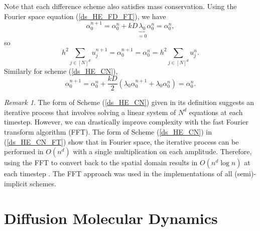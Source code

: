 \documentclass[12pt, reqno]{report}
\theoremstyle{definition}
\theoremstyle{remark}
\newtheorem{remark}[theorem]{Remark}
\begin{document}
Note that each difference scheme also satisfies mass conservation. Using the Fourier space equation (\ref{ds_HE_FD_FT}), we have
\begin{equation*}
	\alpha_0^{n+1}=\alpha_0^n+kD\underbrace{\lambda_0}_{=0}\alpha_0^n=\alpha_0^n,
\end{equation*}
so
\begin{equation} \label{eq_discrete_con}
	h^2\sum_{j\in[N]^d}u_j^{n+1}=\alpha_0^{n+1}=\alpha_0^{n}=h^2\sum_{j\in[N]^d}u_j^n.
\end{equation}
Similarly for scheme (\ref{ds_HE_CN}), 
\begin{equation*}
	\alpha_0^{n+1}=\alpha_0^n+\frac{kD}{2}(\lambda_0\alpha_0^{n+1}+\lambda_0\alpha_0^n)=\alpha_0^n.
\end{equation*}

\begin{remark}
    The form of Scheme (\ref{ds_HE_CN}) given in its definition suggests an iterative process that involves solving a linear system of $N^d$ equations at each timestep.
    However, we can drastically improve complexity with the fast Fourier transform algorithm (FFT). 
    The form of Scheme (\ref{ds_HE_CN}) in (\ref{ds_HE_CN_FT}) show that in Fourier space, the iterative process can be performed in $O(n^d)$ with a single multiplication on each amplitude. 
    Therefore, using the FFT to convert back to the spatial domain results in $O(n^d\log n )$ at each timestep \cite{copetti_1990_kinetics}.
    The FFT approach was used in the implementations of all (semi)-implicit schemes.
\end{remark}

\section{Diffusion Molecular Dynamics} \label{ssec_diff_MD}
\end{document}

